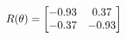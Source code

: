 \documentclass[preview]{standalone}
\begin{document}
\begin{align*}
\special{dvisvgm:raw <g id='unique000'>}R(\theta) = \begin{bmatrix}-0.93 & 0.37\\-0.37 & -0.93\end{bmatrix}\special{dvisvgm:raw </g>}
\end{align*}
\end{document}
